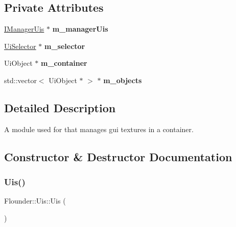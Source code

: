 \subsection*{Private Attributes}
\begin{DoxyCompactItemize}
\item 
\mbox{\label{class_flounder_1_1_uis_a273422c86a607bfc67606a0f783bba32}} 
\hyperlink{class_flounder_1_1_i_manager_uis}{I\+Manager\+Uis} $\ast$ {\bfseries m\+\_\+manager\+Uis}
\item 
\mbox{\label{class_flounder_1_1_uis_a175cac7aa2db420ba9fb139c1221d1cf}} 
\hyperlink{class_flounder_1_1_ui_selector}{Ui\+Selector} $\ast$ {\bfseries m\+\_\+selector}
\item 
\mbox{\label{class_flounder_1_1_uis_a259976d2062a17befe0c8274acffd517}} 
Ui\+Object $\ast$ {\bfseries m\+\_\+container}
\item 
\mbox{\label{class_flounder_1_1_uis_aa71bf4677cc9b72e72af3196a75362ff}} 
std\+::vector$<$ Ui\+Object $\ast$ $>$ $\ast$ {\bfseries m\+\_\+objects}
\end{DoxyCompactItemize}


\subsection{Detailed Description}
A module used for that manages gui textures in a container. 



\subsection{Constructor \& Destructor Documentation}
\mbox{\label{class_flounder_1_1_uis_ae9a32272547373defb5abfc0bf9407a4}} 
\subsubsection{\texorpdfstring{Uis()}{Uis()}}
{\footnotesize\ttfamily Flounder\+::\+Uis\+::\+Uis (\begin{DoxyParamCaption}{ }\end{DoxyParamCaption})}



